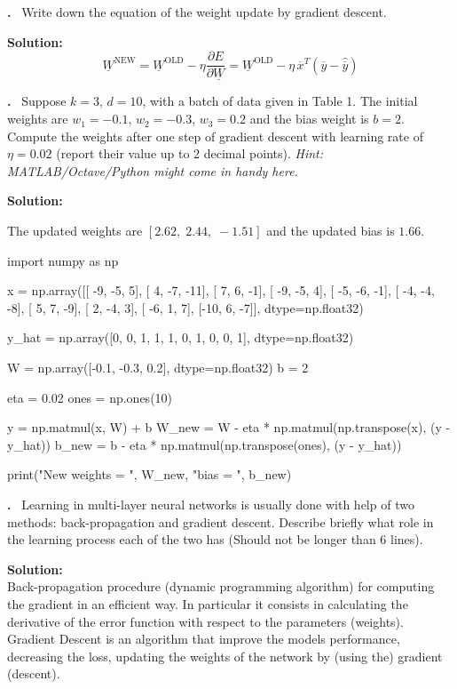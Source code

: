 \documentclass[12pt]{article}
\newcounter{problem}
\newcounter{solution}
\newcommand\Problem{%
	\stepcounter{problem}%
	\textbf{\theproblem.}~%
	\setcounter{solution}{0}%
}
\newcommand\Solution{%
	\textbf{Solution:}\\%
}
\begin{document}
\Problem{Write down the equation of the weight update by gradient descent.}

\Solution{	
	\begin{equation}
	\underline{W}^{\mathrm{NEW}}=\underline{W}^{\mathrm{OLD}}-\eta \frac{\partial E}{\partial \underline{W}}=\underline{W}^{\mathrm{OLD}}-\eta \, \overline{x}^T(\overline{y}-\hat{\overline{y}})
	\end{equation}
}

\Problem{Suppose $k = 3\mbox{, }d =10$, with a batch of data given in Table 1. The initial weights are $w_1 = -0.1$, $w_2 = -0.3$, $w_3 = 0.2$ and the bias weight is $b = 2$. Compute the weights after one step of gradient descent with learning rate of $\eta = 0.02$ (report their value up to 2 decimal points). \textit{Hint: MATLAB/Octave/Python might come in handy here.}}

\Solution{
	The updated weights are $[2.62, \; 2.44, \; -1.51]$ and the updated bias is $1.66$.
	
	\begin{python}
	import numpy as np
				
	x = np.array([[ -9, -5,    5],
				   [   4, -7, -11],
				   [   7,   6,  -1],
				   [ -9, -5,    4],
				   [ -5, -6,  -1],
				   [ -4, -4,  -8],
				   [   5,   7,  -9],
				   [   2, -4,    3],
				   [ -6,   1,    7],
				   [-10,   6,  -7]], dtype=np.float32)
	
	y_hat = np.array([0, 0, 1, 1, 1, 0, 1, 0, 0, 1], dtype=np.float32)
	
	W = np.array([-0.1, -0.3, 0.2], dtype=np.float32)
	b = 2
	
	eta = 0.02
	ones = np.ones(10)
	
	y = np.matmul(x, W) + b
	W_new = W - eta * np.matmul(np.transpose(x), (y - y_hat))
	b_new = b - eta * np.matmul(np.transpose(ones), (y - y_hat))
	
	print("New weights = ", W_new, "\nNew bias = ", b_new)
	\end{python}
	
	}

\Problem{Learning in multi-layer neural networks is usually done with help of two methods: back-propagation and gradient descent. Describe briefly what role in the learning process each of the two has (Should not be longer than $6$ lines).}

\Solution{Back-propagation  procedure (dynamic programming algorithm) for computing the gradient in an efficient way. In particular it consists in calculating the derivative of the error function with respect to the parameters (weights).\\
Gradient Descent is an algorithm that improve the models performance, decreasing the loss, updating the weights of the network by (using the) gradient (descent).}
\printbibliography
\nocite{*}
\end{document}
